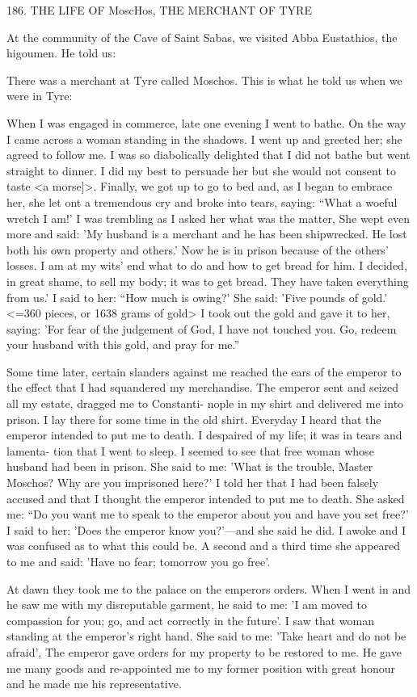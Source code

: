 186. THE LIFE OF MoscHos,
THE MERCHANT OF TYRE

At the community of the Cave of Saint Sabas, we visited Abba
Eustathios, the higoumen. He told us:

There was a merchant at Tyre called Moschos. This is what he told
us when we were in Tyre:

When I was engaged in commerce, late one evening I went to bathe.
On the way I came across a woman standing in the shadows. I went
up and greeted her; she agreed to follow me. I was so diabolically
delighted that I did not bathe but went straight to dinner. I did my
best to persuade her but she would not consent to taste <a morse]>.
Finally, we got up to go to bed and, as I began to embrace her, she
let ont a tremendous cry and broke into tears, saying: “What a
woeful wretch I am!' I was trembling as I asked her what was the
matter, She wept even more and said: 'My husband is a merchant
and he has been shipwrecked. He lost both his own property and
others.' Now he is in prison because of the others' losses. I am at
my wits' end what to do and how to get bread for him. I decided,
in great shame, to sell my body; it was to get bread. They have
taken everything from us.' I said to her: “How much is owing?' She
said: 'Five pounds of gold.' <=360 pieces, or 1638 grams of gold>
I took out the gold and gave it to her, saying: 'For fear of the
judgement of God, I have not touched you. Go, redeem your
husband with this gold, and pray for me.”

Some time later, certain slanders against me reached the ears of
the emperor to the effect that I had squandered my merchandise.
The emperor sent and seized all my estate, dragged me to Constanti-
nople in my shirt and delivered me into prison. I lay there for some
time in the old shirt. Everyday I heard that the emperor intended to
put me to death. I despaired of my life; it was in tears and lamenta-
tion that I went to sleep. I seemed to see that free woman whose
husband had been in prison. She said to me: 'What is the trouble,
Master Moschos? Why are you imprisoned here?' I told her that I
had been falsely accused and that I thought the emperor intended
to put me to death. She asked me: “Do you want me to speak to the
emperor about you and have you set free?' I said to her: 'Does the
emperor know you?'—and she said he did. I awoke and I was
confused as to what this could be. A second and a third time she
appeared to me and said: 'Have no fear; tomorrow you go free'.

At dawn they took me to the palace on the emperor\textquotesingle s orders.
When I went in and he saw me with my disreputable garment, he
said to me: 'I am moved to compassion for you; go, and act
correctly in the future'. I saw that woman standing at the emperor's
right hand. She said to me: 'Take heart and do not be afraid', The
emperor gave orders for my property to be restored to me. He gave
me many goods and re-appointed me to my former position with
great honour and he made me his representative.

